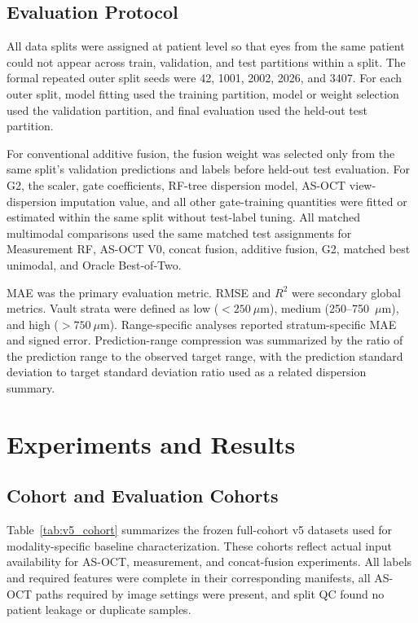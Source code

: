 \documentclass[10pt,twocolumn]{article}
\begin{document}
\subsection{Evaluation Protocol}

All data splits were assigned at patient level so that eyes from the same patient could not appear across train, validation, and test partitions within a split. The formal repeated outer split seeds were 42, 1001, 2002, 2026, and 3407. For each outer split, model fitting used the training partition, model or weight selection used the validation partition, and final evaluation used the held-out test partition.

For conventional additive fusion, the fusion weight was selected only from the same split's validation predictions and labels before held-out test evaluation. For G2, the scaler, gate coefficients, RF-tree dispersion model, AS-OCT view-dispersion imputation value, and all other gate-training quantities were fitted or estimated within the same split without test-label tuning. All matched multimodal comparisons used the same matched test assignments for Measurement RF, AS-OCT V0, concat fusion, additive fusion, G2, matched best unimodal, and Oracle Best-of-Two.

MAE was the primary evaluation metric. RMSE and $R^2$ were secondary global metrics. Vault strata were defined as low ($<250~\mu$m), medium (250--750~$\mu$m), and high ($>750~\mu$m). Range-specific analyses reported stratum-specific MAE and signed error. Prediction-range compression was summarized by the ratio of the prediction range to the observed target range, with the prediction standard deviation to target standard deviation ratio used as a related dispersion summary.

\section{Experiments and Results}

\subsection{Cohort and Evaluation Cohorts}

Table~\ref{tab:v5_cohort} summarizes the frozen full-cohort v5 datasets used for modality-specific baseline characterization. These cohorts reflect actual input availability for AS-OCT, measurement, and concat-fusion experiments. All labels and required features were complete in their corresponding manifests, all AS-OCT paths required by image settings were present, and split QC found no patient leakage or duplicate samples.
\end{document}
